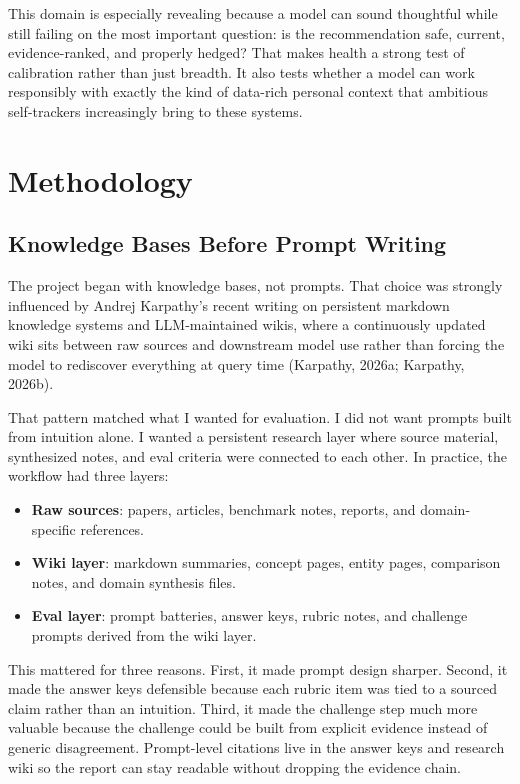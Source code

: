 \documentclass[11pt, a4paper]{article}
\begin{document}
This domain is especially revealing because a model can sound thoughtful while still failing on the most important question: is the recommendation safe, current, evidence-ranked, and properly hedged? That makes health a strong test of calibration rather than just breadth. It also tests whether a model can work responsibly with exactly the kind of data-rich personal context that ambitious self-trackers increasingly bring to these systems.

\section{Methodology}

\subsection{Knowledge Bases Before Prompt Writing}

The project began with knowledge bases, not prompts. That choice was strongly influenced by Andrej Karpathy's recent writing on persistent markdown knowledge systems and LLM-maintained wikis, where a continuously updated wiki sits between raw sources and downstream model use rather than forcing the model to rediscover everything at query time (Karpathy, 2026a; Karpathy, 2026b).

That pattern matched what I wanted for evaluation. I did not want prompts built from intuition alone. I wanted a persistent research layer where source material, synthesized notes, and eval criteria were connected to each other. In practice, the workflow had three layers:

\begin{itemize}[noitemsep]
    \item \textbf{Raw sources}: papers, articles, benchmark notes, reports, and domain-specific references.
    \item \textbf{Wiki layer}: markdown summaries, concept pages, entity pages, comparison notes, and domain synthesis files.
    \item \textbf{Eval layer}: prompt batteries, answer keys, rubric notes, and challenge prompts derived from the wiki layer.
\end{itemize}

This mattered for three reasons. First, it made prompt design sharper. Second, it made the answer keys defensible because each rubric item was tied to a sourced claim rather than an intuition. Third, it made the challenge step much more valuable because the challenge could be built from explicit evidence instead of generic disagreement. Prompt-level citations live in the answer keys and research wiki so the report can stay readable without dropping the evidence chain.
\end{document}
